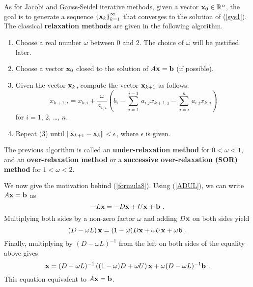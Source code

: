 As for Jacobi and Gauss-Seidel iterative methods, given a vector
$\mathbf{x}_{0} \in \mathbb{R}^n$, the goal is to generate a sequence
$\left\{\mathbf{x}_{k}\right\}_{k=1}^\infty$ that converges to the
solution of (\ref{sys1}). The classical
{\bfseries relaxation methods} are given in
the following algorithm.

\begin{algo}
\begin{enumerate}
\item Choose a real number $\omega$ between $0$ and $2$.  The choice of
$\omega$ will be justified later.
\item Choose a vector $\mathbf{x}_{0}$ closed to the solution of
$ A \mathbf{x} = \mathbf{b}$ (if possible).
\item Given the vector $\mathbf{x}_k$, compute the vector
$\mathbf{x}_{k+1}$ as follows:
\begin{equation} \label{formula8}
x_{k+1,i} = x_{k,i} + \frac{\omega}{a_{i,i}} \left(
b_i -\sum_{j=1}^{i-1}\, a_{i.j} x_{k+1,j}
-\sum_{j=i}^{n}\, a_{i.j} x_{k,j} \right)
\end{equation}
for $i = 1$, $2$, \ldots, $n$. 
\item Repeat (3) until
$\| \mathbf{x}_{k+1} - \mathbf{x}_{k} \| < \epsilon$, where $\epsilon$ is
given.
\end{enumerate}
\end{algo}

The previous algorithm is called an
{\bfseries under-relaxation method}
for $0 < \omega < 1$, and an
{\bfseries over-relaxation method} or a
{\bfseries successive over-relaxation (SOR) method} for $1 < \omega <2$.

We now give the motivation behind (\ref{formula8}).  Using
(\ref{ADUL}), we can write
$A\mathbf{x} = \mathbf{b}$ as 
\[
-L\VEC{x} = -D\VEC{x} + U\VEC{x} + \VEC{b} \ .
\]
Multiplying both sides by a non-zero factor $\omega$ and adding
$D\mathbf{x}$ on both sides yield
\[
\left( D - \omega L\right) \mathbf{x} = (1 - \omega) D\mathbf{x}
+ \omega U\mathbf{x} + \omega \mathbf{b} \ .
\]
Finally, multiplying by $(D-\omega L)^{-1}$ from the left on both
sides of the equality above gives
\begin{equation}\label{rmlongform}
\mathbf{x} = (D-\omega L)^{-1} \left( (1-\omega)D + \omega U\right)
\mathbf{x} + \omega(D-\omega L)^{-1}\mathbf{b} \ .
\end{equation}
This equation equivalent to $A\mathbf{x} = \mathbf{b}$.

